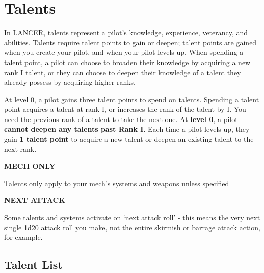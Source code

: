 \section{Talents}

In LANCER, talents represent a pilot's knowledge, experience, veterancy, and abilities. Talents require talent points to gain or deepen; talent points are gained when you create your pilot, and when your pilot levels up. When spending a talent point, a pilot can choose to broaden their knowledge by acquiring a new rank I talent, or they can choose to deepen their knowledge of a talent they already possess by acquiring higher ranks. 

At level 0, a pilot gains three talent points to spend on talents. Spending a talent point acquires a talent at rank I, or increases the rank of the talent by I. You need the previous rank of a talent to take the next one. At \textbf{level 0}, a pilot \textbf{cannot deepen any talents past Rank I}. Each time a pilot levels up, they gain \textbf{1 talent point} to acquire a new talent or deepen an existing talent to the next rank. 

\begin{center}
\textbf{MECH ONLY}
\end{center}
Talents only apply to your mech's systems and weapons unless specified


\begin{center}
\textbf{NEXT ATTACK}
\end{center}
Some talents and systems activate on `next attack roll'  - this means the very next single 1d20 attack roll you make, not the entire skirmish or barrage attack action, for example.

\subsection{Talent List}





























